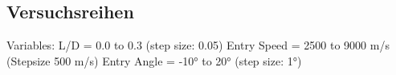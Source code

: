 \subsection{Versuchsreihen}
Variables:
L/D = 0.0 to 0.3 (step size: 0.05)
Entry Speed = 2500 to 9000 m/s \cite{Edquist2009} (Stepsize 500 m/s)
Entry Angle = -10° to 20° (step size: 1°)
